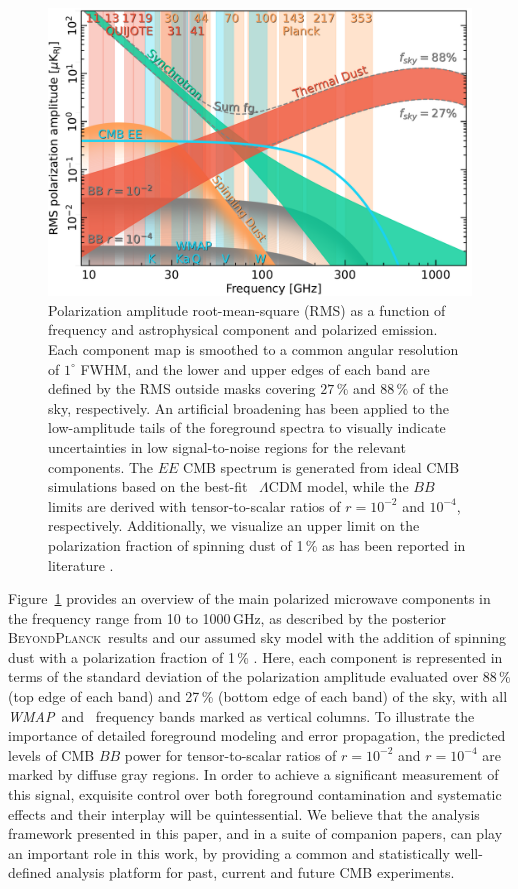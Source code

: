 \documentclass[twocolumn]{aa}
\def\WMAP{\textit{WMAP}}
\newcommand{\BP}{\textsc{BeyondPlanck}}
\newcommand{\?}[1]{\textcolor{red}{{\bf [#1]}}}
\begin{document}
\begin{figure}[t]
  \center
  \includegraphics[width=\linewidth]{figs/spectrum_pol.pdf}
  \caption{Polarization amplitude root-mean-square (RMS) as a function of
    frequency and astrophysical component and polarized emission. Each component
    map is smoothed to a common angular resolution of $1^{\circ}$ FWHM, and the
    lower and upper edges of  each band are defined by the RMS outside masks
    covering $27\,\%$ and $88\,\%$ of the sky, respectively. An artificial
    broadening has been applied to the low-amplitude tails of the foreground
    spectra to visually indicate uncertainties in low signal-to-noise regions
    for the relevant components. The $EE$ CMB spectrum is generated from ideal
    CMB simulations based on the best-fit \Planck\ $\Lambda$CDM model, while the
    $BB$ limits are derived with tensor-to-scalar ratios of $r=10^{-2}$ and
    $10^{-4}$, respectively. Additionally, we visualize an upper limit on the
    polarization fraction of spinning dust of 1\,\% as has been reported in
    literature \citep{QUIJOTE_II_2016, macellari2011, bp15}.}
  \label{fig:skymodel}
  \end{figure} 
Figure~\ref{fig:skymodel} provides an overview of the main polarized microwave
components in the frequency range from 10 to 1000\,GHz, as described by the
posterior \BP\ results and our assumed sky model with the addition of spinning
dust with a polarization fraction of 1\,\%  \citep{QUIJOTE_II_2016,bp15}. Here, each
component is represented in terms of the standard deviation of the polarization
amplitude evaluated over 88\,\% (top edge of each band) and 27\,\% (bottom edge
of each band) of the sky, with all \WMAP\ and \Planck\ frequency bands marked as
vertical columns. To illustrate the importance of detailed foreground modeling
and error propagation, the predicted levels of CMB $BB$ power for
tensor-to-scalar ratios of $r=10^{-2}$ and $r=10^{-4}$ are marked by diffuse
gray regions. In order to achieve a significant measurement of this signal,
exquisite control over both foreground contamination and systematic effects and
their interplay will be quintessential. We believe that the analysis framework
presented in this paper, and in a suite of companion papers, can play an
important role in this work, by providing a common and statistically
well-defined analysis platform for past, current and future CMB experiments.






\end{document}
